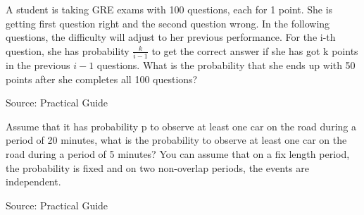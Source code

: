\begin{exe}
A student is taking GRE exams with 100 questions, each for 1 point. She is getting first question right and the second question wrong. In the following questions, the difficulty will adjust to her previous performance. For the i-th question, she has probability $\frac{k}{i-1}$ to get the correct answer if she has got k points in the previous $i-1$ questions. What is the probability that she ends up with 50 points after she completes all 100 questions?
\end{exe}
Source: Practical Guide
\begin{teacher}
\begin{sol}
\end{sol}
\end{teacher}

\begin{exe}
Assume that it has probability p to observe at least one car on the road during a period of 20 minutes, what is the probability to observe at least one car on the road during a period of 5 minutes? You can assume that on a fix length period, the probability is fixed and on two non-overlap periods, the events are independent.
\end{exe}
Source: Practical Guide
\begin{teacher}
\begin{sol}
\end{sol}
\end{teacher}








